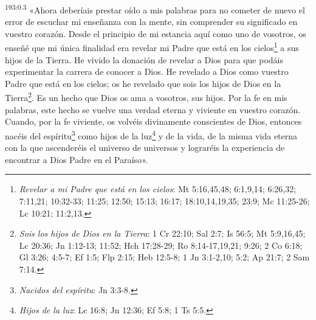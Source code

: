 \par 
\textsuperscript{193:0.3} «Ahora deberíais prestar oído a mis palabras para no cometer de nuevo el error de escuchar mi enseñanza con la mente, sin comprender su significado en vuestro corazón. Desde el principio de mi estancia aquí como uno de vosotros, os enseñé que mi única finalidad era revelar mi Padre que está en los cielos\footnote{\textit{Revelar a mi Padre que está en los cielos}: Mt 5:16,45,48; 6:1,9,14; 6:26,32; 7:11,21; 10:32-33; 11:25; 12:50; 15:13; 16:17; 18:10,14,19,35; 23:9; Mc 11:25-26; Lc 10:21; 11:2,13.} a sus hijos de la Tierra. He vivido la donación de revelar a Dios para que podáis experimentar la carrera de conocer a Dios. He revelado a Dios como vuestro Padre que está en los cielos; os he revelado que sois los hijos de Dios en la Tierra\footnote{\textit{Sois los hijos de Dios en la Tierra}: 1 Cr 22:10; Sal 2:7; Is 56:5; Mt 5:9,16,45; Lc 20:36; Jn 1:12-13; 11:52; Hch 17:28-29; Ro 8:14-17,19,21; 9:26; 2 Co 6:18; Gl 3:26; 4:5-7; Ef 1:5; Flp 2:15; Heb 12:5-8; 1 Jn 3:1-2,10; 5:2; Ap 21:7; 2 Sam 7:14.}. Es un hecho que Dios os ama a vosotros, sus hijos. Por la fe en mis palabras, este hecho se vuelve una verdad eterna y viviente en vuestro corazón. Cuando, por la fe viviente, os volvéis divinamente conscientes de Dios, entonces nacéis del espíritu\footnote{\textit{Nacidos del espíritu}: Jn 3:3-8.} como hijos de la luz\footnote{\textit{Hijos de la luz}: Lc 16:8; Jn 12:36; Ef 5:8; 1 Ts 5:5.} y de la vida, de la misma vida eterna con la que ascenderéis el universo de universos y lograréis la experiencia de encontrar a Dios Padre en el Paraíso».

